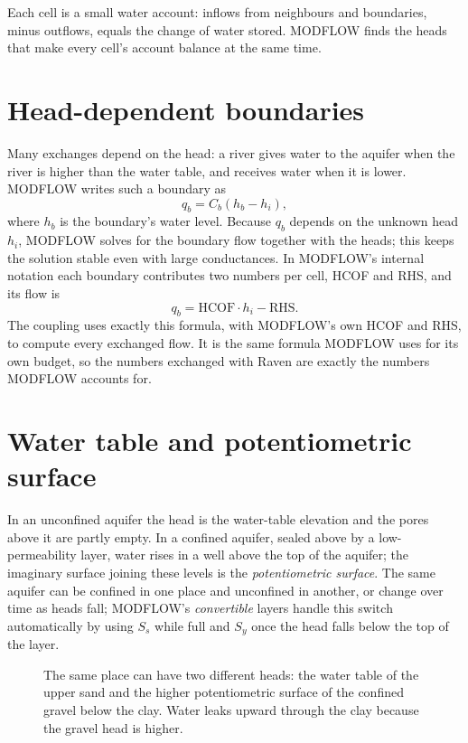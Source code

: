 \begin{plain}
Each cell is a small water account: inflows from neighbours and boundaries, minus outflows, equals the change of water
stored. MODFLOW finds the heads that make every cell's account balance at the same time.
\end{plain}

\section{Head-dependent boundaries}
Many exchanges depend on the head: a river gives water to the aquifer when the river is higher than the water table,
and receives water when it is lower. MODFLOW writes such a boundary as
\begin{equation}
q_b = C_b\left(h_b-h_i\right),
\end{equation}
where $h_b$ is the boundary's water level. Because $q_b$ depends on the unknown head $h_i$, MODFLOW solves for the
boundary flow together with the heads; this keeps the solution stable even with large conductances. In MODFLOW's
internal notation each boundary contributes two numbers per cell, HCOF and RHS, and its flow is
\begin{equation}
q_b = \mathrm{HCOF}\cdot h_i-\mathrm{RHS}.
\end{equation}
The coupling uses exactly this formula, with MODFLOW's own HCOF and RHS, to compute every exchanged flow. It is the same
formula MODFLOW uses for its own budget, so the numbers exchanged with Raven are exactly the numbers MODFLOW accounts for.

\section{Water table and potentiometric surface}
In an unconfined aquifer the head is the water-table elevation and the pores above it are partly empty. In a confined
aquifer, sealed above by a low-permeability layer, water rises in a well above the top of the aquifer; the imaginary
surface joining these levels is the \emph{potentiometric surface}. The same aquifer can be confined in one place and
unconfined in another, or change over time as heads fall; MODFLOW's \emph{convertible} layers handle this switch
automatically by using $S_s$ while full and $S_y$ once the head falls below the top of the layer.

\begin{figure}[!htbp]\centering

\caption{The same place can have two different heads: the water table of the upper sand and the higher potentiometric surface of
the confined gravel below the clay. Water leaks upward through the clay because the gravel head is higher.}\label{fig:potsurf}
\end{figure}
